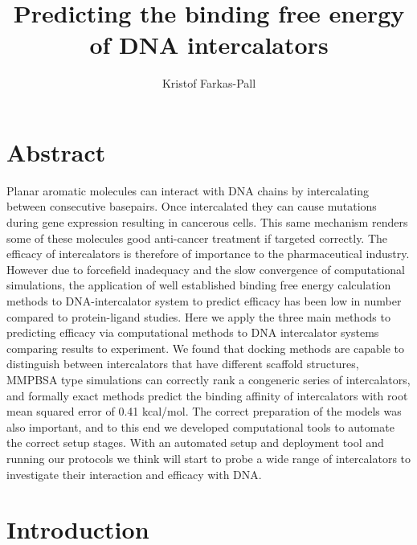 \documentclass[11pt, a4paper]{article}
\title{Predicting the binding free energy of DNA intercalators}
\author{Kristof Farkas-Pall}
\begin{document}

\section*{Abstract}

Planar aromatic molecules can interact with DNA chains by intercalating between consecutive basepairs. Once intercalated they can cause mutations during gene expression resulting in cancerous cells. This same mechanism renders some of these molecules good anti-cancer treatment if targeted correctly. The efficacy of intercalators is therefore of importance to the pharmaceutical industry. However due to forcefield inadequacy and the slow convergence of computational simulations, the application of well established binding free energy calculation methods to DNA-intercalator system to predict efficacy has been low in number compared to protein-ligand studies. Here we apply the three main methods to predicting efficacy via computational methods to DNA intercalator systems comparing results to experiment. We found that docking methods are capable to distinguish between intercalators that have different scaffold structures, MMPBSA type simulations can correctly rank a congeneric series of intercalators, and formally exact methods predict the binding affinity of intercalators with root mean squared error of 0.41 kcal/mol. The correct preparation of the models was also important, and to this end we developed computational tools to automate the correct setup stages. With an automated setup and deployment tool and running our protocols we think will start to probe a wide range of intercalators to investigate their interaction and efficacy with DNA.

\section{Introduction}








%
%
\end{document}
